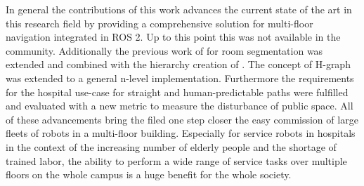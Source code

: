 In general the contributions of this work advances the current state of the art in this research field by providing a comprehensive solution for multi-floor navigation integrated in ROS 2. Up to this point this was not available in the community. Additionally the previous work of \cite{ryu_hierarchical_2020} for room segmentation was extended and combined with the hierarchy creation of \cite{gregoric_autonomous_2022}. The concept of H-graph was extended to a general n-level implementation. Furthermore the requirements for the hospital use-case for straight and human-predictable paths were fulfilled and evaluated with a new metric to measure the disturbance of public space. All of these advancements bring the filed one step closer the easy commission of large fleets of robots in a multi-floor building. Especially for service robots in hospitals in the context of the increasing number of elderly people and the shortage of trained labor, the ability to perform a wide range of service tasks over multiple floors on the whole campus is a huge benefit for the whole society.